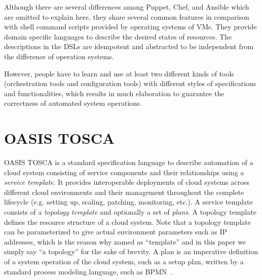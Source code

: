 \documentclass[12pt]{report}
\begin{document}
Although there are several differences among Puppet, Chef, and Ansible
which are omitted to explain here, they share several common features in
comparison with shell command scripts provided by operating systems
of VMs. They provide domain specific languages to describe the
desired states of resources. The descriptions in the DSLs are
idempotent and abstracted to be independent from the difference of
operation systems.

However, people have to learn and use at least two different kinds of
tools (orchestration tools and configuration tools) with different
styles of specifications and functionalities, which results in much
elaboration to guarantee the correctness of automated system operations.

\section{OASIS TOSCA}
\label{sec:TOSCA}
OASIS TOSCA\cite{TOSCA} is a standard specification language to
describe automation of a cloud system consisting of service components
and their relationships using a {\it service template}. It provides
interoperable deployments of cloud systems across different cloud
environments and their management throughout the complete lifecycle
(e.g. setting up, scaling, patching, monitoring, etc.).  A service
template consists of a {\it topology template} and optionally a set of
{\it plans}. A topology template defines the resource structure of a
cloud system. Note that a topology template can be parameterized to
give actual environment parameters such as IP addresses, which is the
reason why named as ``template'' and in this paper we simply say ``a
topology'' for the sake of brevity. A plan is an imperative definition
of a system operation of the cloud system, such as a setup plan,
written by a standard process modeling language, such as BPMN~\cite{BPMN}.
\end{document}
